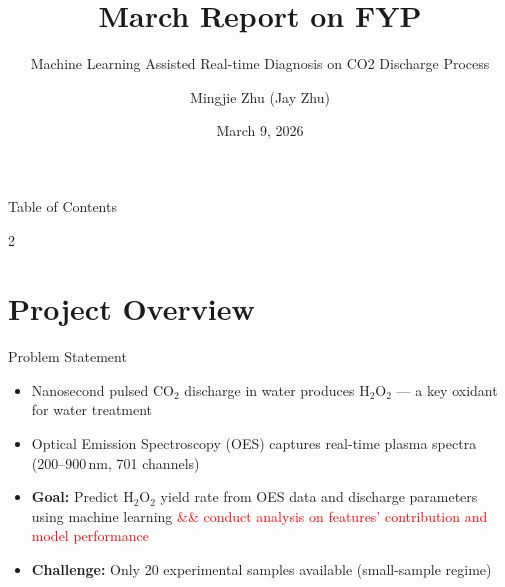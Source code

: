 \documentclass{libs/XJTLU_format}
\title[University of Liverpool Beamer Template]{\huge\textbf{March Report on FYP}}
\subtitle{Machine Learning Assisted Real-time Diagnosis on CO2 Discharge Process}
\author{Mingjie Zhu (Jay Zhu)}
\institute[University of Liverpool]{
    \normalsize{\email{sgmzhu11@liverpool.ac.uk}}
    \newline
    \university{University of Liverpool}
}
\date{March 9, 2026}
\begin{document}


\begin{frame}{}
    \maketitle
\end{frame}

\begin{frame}{Table of Contents}
    \begin{multicols}{2}
        \tableofcontents
    \end{multicols}
\end{frame}


\section{Project Overview}

\begin{frame}{Problem Statement}
    \begin{itemize}
        \item Nanosecond pulsed CO$_2$ discharge in water produces H$_2$O$_2$ --- a key oxidant for water treatment
        \item Optical Emission Spectroscopy (OES) captures real-time plasma spectra (200--900\,nm, 701 channels)
        \item \textbf{Goal:} Predict H$_2$O$_2$ yield rate from OES data and discharge parameters using machine learning 
        \textcolor{red}{\&\& conduct analysis on features' contribution and model performance}
        \item \textbf{Challenge:} Only 20 experimental samples available (small-sample regime)
    \end{itemize}
\end{frame}
\end{document}
